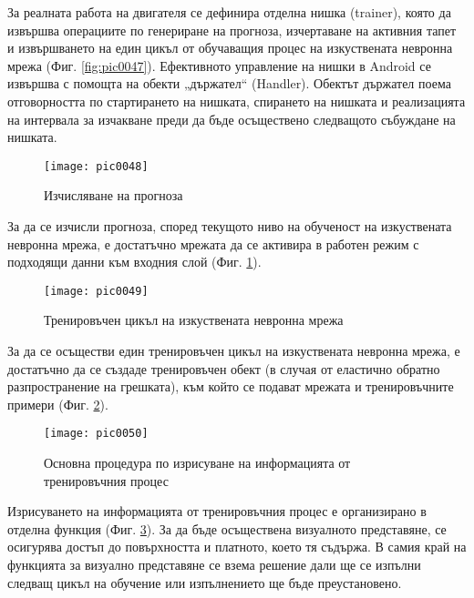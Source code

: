 За реалната работа на двигателя се дефинира отделна нишка (trainer), която да извършва операциите по генериране на прогноза, изчертаване на активния тапет и извършването на един цикъл от обучаващия процес на изкуствената невронна мрежа (Фиг. \ref{fig:pic0047}). Ефективното управление на нишки в Android се извършва с помощта на обекти „държател“ (Handler). Обектът държател поема отговорността по стартирането на нишката, спирането на нишката и реализацията на интервала за изчакване преди да бъде осъществено следващото събуждане на нишката. 

\begin{figure}[h]
  \centering
  \texttt{[image: pic0048]}
  \caption{Изчисляване на прогноза}
\label{fig:pic0048}
\end{figure}
\FloatBarrier

За да се изчисли прогноза, според текущото ниво на обученост на изкуствената невронна мрежа, е достатъчно мрежата да се активира в работен режим с подходящи данни към входния слой (Фиг. \ref{fig:pic0048}).

\begin{figure}[h]
  \centering
  \texttt{[image: pic0049]}
  \caption{Тренировъчен цикъл на изкуствената невронна мрежа}
\label{fig:pic0049}
\end{figure}
\FloatBarrier

За да се осъществи един тренировъчен цикъл на изкуствената невронна мрежа, е достатъчно да се създаде тренировъчен обект (в случая от еластично обратно разпространение на грешката), към който се подават мрежата и тренировъчните примери (Фиг. \ref{fig:pic0049}).

\begin{figure}[h]
  \centering
  \texttt{[image: pic0050]}
  \caption{Основна процедура по изрисуване на информацията от тренировъчния процес}
\label{fig:pic0050}
\end{figure}
\FloatBarrier

Изрисуването на информацията от тренировъчния процес е организирано в отделна функция (Фиг. \ref{fig:pic0050}). За да бъде осъществена визуалното представяне, се осигурява достъп до повърхността и платното, което тя съдържа. В самия край на функцията за визуално представяне се взема решение дали ще се изпълни следващ цикъл на обучение или изпълнението ще бъде преустановено. 

